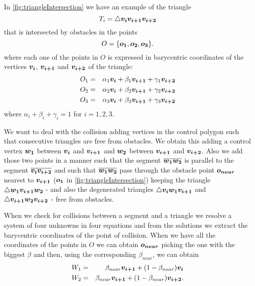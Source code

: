 \documentclass[dissertation.tex]{subfiles}
\begin{document}
In \cref{fig:triangleIntersection} we have an example of the triangle
\begin{equation*}
  T_i = \triangle \boldsymbol{v_i}\boldsymbol{v_{i+1}}\boldsymbol{v_{i+2}} 
\end{equation*}
that is
intersected by obstacles in the points
\begin{equation*}
  O = \{\boldsymbol{o_1},\boldsymbol{o_2},\boldsymbol{o_3}\}.
\end{equation*}
where each one of the points in $O$ is expressed in barycentric
coordinates of the vertices $\boldsymbol{v_i}$, $\boldsymbol{v_{i+1}}$ and $\boldsymbol{v_{i+2}}$ of the
triangle:
\begin{eqnarray*}
  O_1&=&\alpha_1 \boldsymbol{v_i}+\beta_1 \boldsymbol{v_{i+1}}+\gamma_1 \boldsymbol{v_{i+2}}\\
  O_2&=&\alpha_2 \boldsymbol{v_i}+\beta_2 \boldsymbol{v_{i+1}}+\gamma_2 \boldsymbol{v_{i+2}}\\
  O_3&=&\alpha_3 \boldsymbol{v_i}+\beta_3 \boldsymbol{v_{i+1}}+\gamma_3 \boldsymbol{v_{i+2}}
\end{eqnarray*}
where $\alpha_i+\beta_i+\gamma_i=1$ for $i=1,2,3$.

We want to deal with the collision adding vertices in the control
polygon such that consecutive triangles are free from obstacles. We
obtain this adding a control vertex $\boldsymbol{w_1}$ between $\boldsymbol{v_i}$ and $\boldsymbol{v_{i+1}}$
and $\boldsymbol{w_2}$ between $\boldsymbol{v_{i+1}}$ and $\boldsymbol{v_{i+2}}$. Also we add those two
points in a manner such that the segment $\overline{\boldsymbol{w_1}\boldsymbol{w_2}}$ is
parallel to the segment $\overline{\boldsymbol{v_i}\boldsymbol{v_{i+2}}}$ and such that
$\overline{\boldsymbol{w_1}\boldsymbol{w_2}}$ pass through the obstacle point $\boldsymbol{o_{near}}$ nearest
to $\boldsymbol{v_{i+1}}$ ($\boldsymbol{o_1}$ in \cref{fig:triangleIntersection}) keeping the
triangle $\triangle \boldsymbol{w_1}\boldsymbol{v_{i+1}}\boldsymbol{w_2}$ - and also
the degenerated triangles $\triangle \boldsymbol{v_i}\boldsymbol{w_1}\boldsymbol{v_{i+1}}$ and $\triangle
\boldsymbol{v_{i+1}}\boldsymbol{w_2}\boldsymbol{v_{i+2}}$ - free from obstacles.

When we check for collisions between a segment and a triangle we
resolve a system of four unknowns in
four equations and from the solutions we extract the barycentric
coordinates of
the point of collision. When we have all the coordinates of the points
in $O$ we can obtain $\boldsymbol{o_{near}}$ picking the one with the biggest $\beta$
and then, using the corresponding $\beta_{near}$, we can obtain
\begin{eqnarray*}
  W_1&=&\beta_{near} \boldsymbol{v_{i+1}}+(1-\beta_{near})\boldsymbol{v_i}\\
  W_2&=&\beta_{near} \boldsymbol{v_{i+1}}+(1-\beta_{near})\boldsymbol{v_{i+2}}.
\end{eqnarray*}
\end{document}
